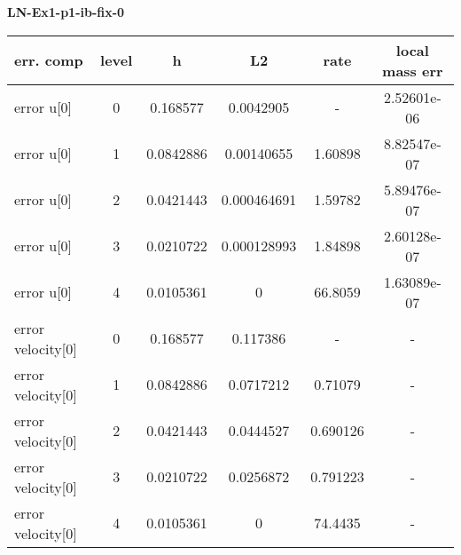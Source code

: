 \documentclass{amsart}
\begin{document}
\begin{center}   
{\bf LN-Ex1-p1-ib-fix-0 }\end{center}  
\tableofcontents

\begin{table}[h!]
\begin{tabular}{|l|c|c|c|c|c|}
\hline
err. comp & level & h  & L2 & rate  & local mass err \\ 
\hline
error u[0] & 0 & 0.168577  & 0.0042905 & -          &  2.52601e-06 \\ 
error u[0] & 1 & 0.0842886 & 0.00140655 & 1.60898   &  8.82547e-07 \\ 
error u[0] & 2 & 0.0421443 & 0.000464691 & 1.59782  &  5.89476e-07 \\ 
error u[0] & 3 & 0.0210722 & 0.000128993 & 1.84898  &  2.60128e-07 \\ 
error u[0] & 4 & 0.0105361 & 0 & 66.8059            &  1.63089e-07 \\ 
error velocity[0] & 0 & 0.168577  & 0.117386  & -   & - \\ 
error velocity[0] & 1 & 0.0842886 & 0.0717212 & 0.71079   & - \\ 
error velocity[0] & 2 & 0.0421443 & 0.0444527 & 0.690126   & - \\ 
error velocity[0] & 3 & 0.0210722 & 0.0256872 & 0.791223   & - \\ 
error velocity[0] & 4 & 0.0105361 & 0 & 74.4435   & - \\ 

\hline
\end{tabular}
\end{table}
\end{document}
